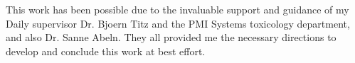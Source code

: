 This work has been possible due to the invaluable support and guidance of my Daily supervisor Dr. Bjoern Titz and the PMI Systems toxicology department, and also Dr. Sanne Abeln. They all provided me the necessary directions to develop and conclude this work at best effort.
